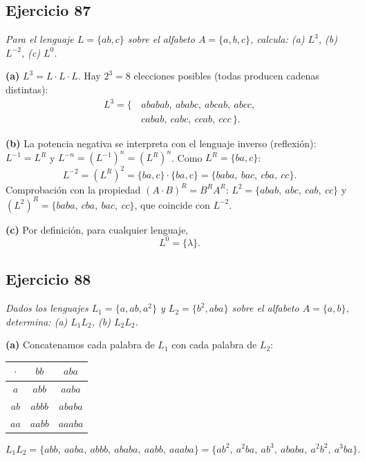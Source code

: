 \subsection*{Ejercicio 87}

\noindent\textit{Para el lenguaje $L = \{ab, c\}$ sobre el alfabeto
    $A = \{a, b, c\}$, calcula: (a) $L^3$, (b) $L^{-2}$, (c) $L^0$.}

\medskip
\noindent\textbf{(a)} $L^3 = L \cdot L \cdot L$. Hay $2^3 = 8$ elecciones posibles
(todas producen cadenas distintas):
\[
\begin{aligned}
    L^3 = \{\, & ababab,\ ababc,\ abcab,\ abcc,\\
    & cabab,\ cabc,\ ccab,\ ccc \,\}.
\end{aligned}
\]

\medskip
\noindent\textbf{(b)} La potencia negativa se interpreta con el lenguaje inverso
(reflexión): $L^{-1} = L^R$ y $L^{-n} = (L^{-1})^n = (L^R)^n$. Como
$L^R = \{ba, c\}$:
\[
L^{-2} = (L^R)^2 = \{ba, c\} \cdot \{ba, c\} = \{baba,\ bac,\ cba,\ cc\}.
\]
Comprobación con la propiedad $(A \cdot B)^R = B^R A^R$: $L^2 = \{abab,\ abc,\ cab,\ cc\}$
y $(L^2)^R = \{baba,\ cba,\ bac,\ cc\}$, que coincide con $L^{-2}$.

\medskip
\noindent\textbf{(c)} Por definición, para cualquier lenguaje,
\[
L^0 = \{\lambda\}.
\]

\subsection*{Ejercicio 88}

\noindent\textit{Dados los lenguajes $L_1 = \{a, ab, a^2\}$ y $L_2 = \{b^2, aba\}$
    sobre el alfabeto $A = \{a, b\}$, determina: (a) $L_1L_2$, (b) $L_2L_2$.}

\medskip
\noindent\textbf{(a)} Concatenamos cada palabra de $L_1$ con cada palabra de $L_2$:

\begin{center}
    \begin{tabular}{|c|c|c|}
        \hline
        $\cdot$ & $bb$ & $aba$ \\
        \hline
        $a$  & $abb$  & $aaba$  \\
        $ab$ & $abbb$ & $ababa$ \\
        $aa$ & $aabb$ & $aaaba$ \\
        \hline
    \end{tabular}
\end{center}
\[
L_1 L_2 = \{abb,\ aaba,\ abbb,\ ababa,\ aabb,\ aaaba\}
= \{ab^2,\ a^2ba,\ ab^3,\ ababa,\ a^2b^2,\ a^3ba\}.
\]

